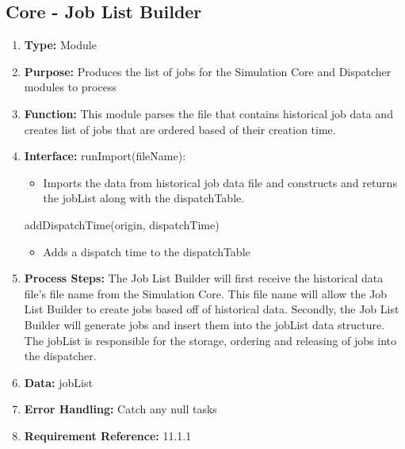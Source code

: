 \documentclass[paper=letter, fontsize=10pt]{scrartcl}
\numberwithin{equation}{section}		%
\numberwithin{figure}{section}			%
\numberwithin{table}{section}				%
\begin{document}
\subsection{Core - Job List Builder}
\begin{enumerate}[]
	\item \textbf{Type:} Module
	\item \textbf{Purpose:} Produces the list of jobs for the Simulation Core and Dispatcher modules to process
	\item \textbf{Function:} This module parses the file that contains historical job data and creates list of jobs that are ordered based of their creation time.
	\item \textbf{Interface:} \newline
		runImport(fileName):
		\begin{itemize}
			\item Imports the data from historical job data file and constructs and returns the jobList along with the dispatchTable.
		\end{itemize}
		addDispatchTime(origin, dispatchTime)
		\begin{itemize}
			\item Adds a dispatch time to the dispatchTable
		\end{itemize}
	\item \textbf{Process Steps:} The Job List Builder will first receive the historical data file's file name from the Simulation Core.  This file name will allow the Job List Builder to create jobs based off of historical data.  Secondly, the Job List Builder will generate jobs and insert them into the jobList data structure.  The jobList is responsible for the storage, ordering and releasing of jobs into the dispatcher.
	\item \textbf{Data:} jobList
	\item \textbf{Error Handling:} Catch any null tasks
	\item \textbf{Requirement Reference:} 11.1.1
\end{enumerate}
\end{document}
